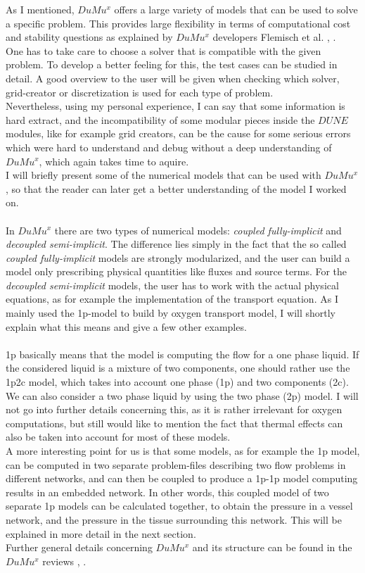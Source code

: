 As I mentioned, $DuMu^x$ offers a large variety of models that can be used to solve a specific problem. This provides large flexibility in terms of computational cost and stability questions as explained by $DuMu^x$ developers Flemisch et al. \cite{flemischdumux}, \cite{flemisch2007dumux}.
\\One has to take care to choose a solver that is compatible with the given problem. To develop a better feeling for this, the test cases can be studied in detail. A good overview to the user will be given when checking which solver, grid-creator or discretization is used for each type of problem.
\\Nevertheless, using my personal experience, I can say that some information is hard extract, and the incompatibility of some modular pieces inside the $DUNE$ modules, like for example grid creators, can be the cause for some serious errors which were hard to understand and debug without a deep understanding of $DuMu^x$, which again takes time to aquire.
\\I will briefly present some of the numerical models that can be used with $DuMu^x$, so that the reader can later get a better understanding of the model I worked on.\\
\\In $DuMu^x$ there are two types of numerical models: \emph{coupled fully-implicit} and \emph{decoupled semi-implicit}. The difference lies simply in the fact that the so called \emph{coupled fully-implicit} models are strongly modularized, and the user can build a model only prescribing physical quantities like fluxes and source terms. For the \emph{decoupled semi-implicit} models, the user has to work with the actual physical equations, as for example the implementation of the transport equation. As I mainly used the 1p-model to build by oxygen transport model, I will shortly explain what this means and give a few other examples.\\
\\1p basically means that the model is computing the flow for a one phase liquid. If the considered liquid is a mixture of two components, one should rather use the 1p2c model, which takes into account one phase (1p) and two components (2c). We can also consider a two phase liquid by using the two phase (2p) model. I will not go into further details concerning this, as it is rather irrelevant for oxygen computations, but still would like to mention the fact that thermal effects can also be taken into account for most of these models.
\\A more interesting point for us is that some models, as for example the 1p model, can be computed in two separate problem-files describing two flow problems in different networks, and can then be coupled to produce a 1p-1p model computing results in an embedded network. In other words, this coupled model of two separate 1p models can be calculated together, to obtain the pressure in a vessel network, and the pressure in the tissue surrounding this network. This will be explained in more detail in the next section.
\\Further general details concerning $DuMu^x$ and its structure can be found in the $DuMu^x$ reviews  \cite{flemischdumux}, \cite{flemisch2007dumux}.

